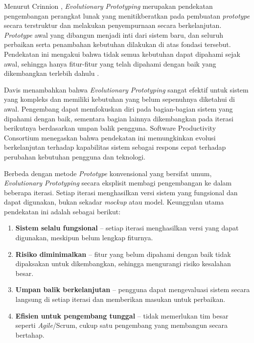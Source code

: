 Menurut Crinnion \cite{crinnion1991evolutionary}, \textit{Evolutionary Prototyping} merupakan pendekatan pengembangan perangkat lunak yang menitikberatkan pada pembuatan \textit{prototype} secara terstruktur dan melakukan penyempurnaan secara berkelanjutan. \textit{Prototype} awal yang dibangun menjadi inti dari sistem baru, dan seluruh perbaikan serta penambahan kebutuhan dilakukan di atas fondasi tersebut. Pendekatan ini mengakui bahwa tidak semua kebutuhan dapat dipahami sejak awal, sehingga hanya fitur-fitur yang telah dipahami dengan baik yang dikembangkan terlebih dahulu \cite{davis1992operational}.\par

Davis \cite{davis1992operational} menambahkan bahwa \textit{Evolutionary Prototyping} sangat efektif untuk sistem yang kompleks dan memiliki kebutuhan yang belum sepenuhnya diketahui di awal. Pengembang dapat memfokuskan diri pada bagian-bagian sistem yang dipahami dengan baik, sementara bagian lainnya dikembangkan pada iterasi berikutnya berdasarkan umpan balik pengguna. Software Productivity Consortium \cite{spc1997erd} menegaskan bahwa pendekatan ini memungkinkan evolusi berkelanjutan terhadap kapabilitas sistem sebagai respons cepat terhadap perubahan kebutuhan pengguna dan teknologi.\par

Berbeda dengan metode \textit{Prototype} konvensional yang bersifat umum, \textit{Evolutionary Prototyping} secara eksplisit membagi pengembangan ke dalam beberapa iterasi. Setiap iterasi menghasilkan versi sistem yang fungsional dan dapat digunakan, bukan sekadar \textit{mockup} atau model. Keunggulan utama pendekatan ini adalah sebagai berikut:\par

\begin{enumerate}[noitemsep]
	\item \textbf{Sistem selalu fungsional} -- setiap iterasi menghasilkan versi yang dapat digunakan, meskipun belum lengkap fiturnya.
	\item \textbf{Risiko diminimalkan} -- fitur yang belum dipahami dengan baik tidak dipaksakan untuk dikembangkan, sehingga mengurangi risiko kesalahan besar.
	\item \textbf{Umpan balik berkelanjutan} -- pengguna dapat mengevaluasi sistem secara langsung di setiap iterasi dan memberikan masukan untuk perbaikan.
	\item \textbf{Efisien untuk pengembang tunggal} -- tidak memerlukan tim besar seperti \textit{Agile}/Scrum, cukup satu pengembang yang membangun secara bertahap.
\end{enumerate}

